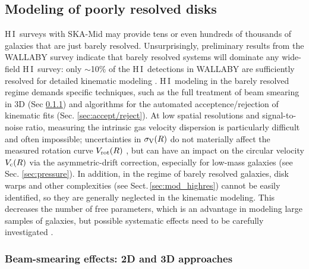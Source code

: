 \documentclass[a4paper,11pt]{article}
\newcommand{\hi } {{\rm H}\,{\small\rm I}}
\begin{document}
\subsection{Modeling of poorly resolved disks}\label{sec:mod_lowres}

\hi\ surveys with SKA-Mid may provide tens or even hundreds of thousands of galaxies that are just barely resolved. Unsurprisingly, preliminary results from the WALLABY survey indicate that barely resolved systems will dominate any wide-field \hi\ survey: only $\sim$10$\%$ of the \hi\ detections in WALLABY are sufficiently resolved for detailed kinematic modeling \citep{Westmeier2022,Murugeshan2024}. \hi\ modeling in the barely resolved regime demands specific techniques, such as the full treatment of beam smearing in 3D (Sec \ref{sec:beamsmearing}) and algorithms for the automated acceptence/rejection of kinematic fits (Sec. \ref{sec:accept/reject}). At low spatial resolutions and signal-to-noise ratio, measuring the intrinsic gas velocity dispersion is particularly difficult and often impossible; uncertainties in $\sigma_{\rm V}(R)$ do not materially affect the measured rotation curve $V_{\rm rot}(R)$ \citep{Deg2022}, but can have an impact on the circular velocity $V_{\rm c}(R)$ via the asymmetric-drift correction, especially for low-mass galaxies (see Sec. \ref{sec:pressure}). In addition, in the regime of barely resolved galaxies, disk warps and other complexities (see Sect.\,\ref{sec:mod_highres}) cannot be easily identified, so they are generally neglected in the kinematic modeling. This decreases the number of free parameters, which is an advantage in modeling large samples of galaxies, but possible systematic effects need to be carefully investigated \citep[e.g.,][]{Deg2022, Gasser2023}.

\subsubsection{Beam-smearing effects: 2D and 3D approaches}\label{sec:beamsmearing}
\end{document}
